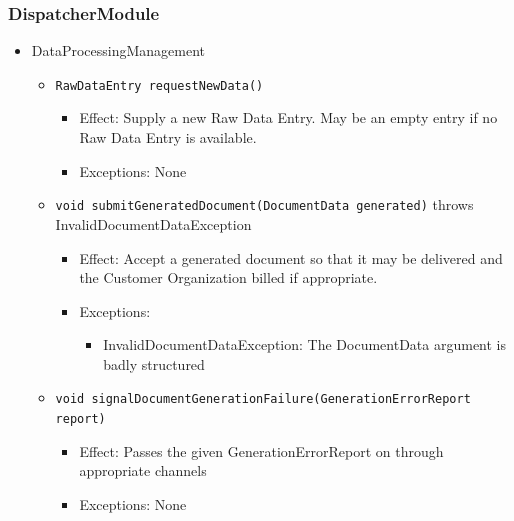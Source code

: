 \documentclass[a4paper,10pt]{article}
\begin{document}
\subsubsection*{DispatcherModule}
\begin{itemize}
    \item DataProcessingManagement
    \begin{itemize}
        \item \texttt{RawDataEntry requestNewData()}
        \begin{itemize}
            \item Effect: Supply a new Raw Data Entry. May be an empty entry if no Raw Data Entry is available.
            \item Exceptions: None
        \end{itemize}

        \item \texttt{void submitGeneratedDocument(DocumentData generated)} throws InvalidDocumentDataException
        \begin{itemize}
            \item Effect: Accept a generated document so that it may be delivered and the Customer Organization billed if appropriate.
            \item Exceptions:
            \begin{itemize}
            	\item InvalidDocumentDataException: The DocumentData argument is badly structured
            \end{itemize}
        \end{itemize}

        \item \texttt{void signalDocumentGenerationFailure(GenerationErrorReport report)}
        \begin{itemize}
        	\item Effect: Passes the given GenerationErrorReport on through appropriate channels
        	\item Exceptions: None
        \end{itemize}


\end{itemize}
\end{itemize}
\end{document}
